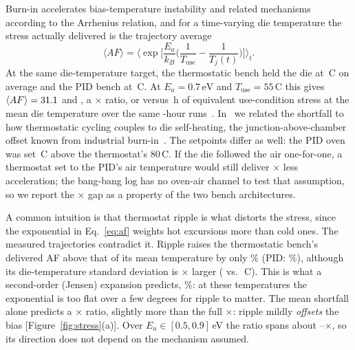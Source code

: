 \documentclass[10pt,twocolumn]{article}
\newcommand{\degC}{\,\textdegree C}
\newcommand{\unit}[1]{\,\mathrm{#1}}
\begin{document}
Burn-in accelerates bias-temperature instability and related mechanisms according to the Arrhenius relation, and for a time-varying die temperature the stress actually delivered is the trajectory average
\begin{equation}
\langle AF\rangle=\Big\langle \exp\!\Big[\frac{E_a}{k_B}\Big(\frac{1}{T_{\mathrm{use}}}-\frac{1}{T_j(t)}\Big)\Big]\Big\rangle_t .
\label{eq:af}
\end{equation}
At the same die-temperature target, the thermostatic bench held the die at \vTBB\degC{} on average and the PID bench at \vTPID\degC. At $E_a=0.7\unit{eV}$ and $T_{\mathrm{use}}=55$\degC{} this gives $\langle AF\rangle=31.1$ and \vAFPID, a \vAFratio$\times$ ratio, or \vEqhBB{} versus \vEqhPID\,h of equivalent use-condition stress at the mean die temperature over the same \vDurPair-hour runs~\cite{sbcci26}. In~\cite{sbcci26} we related the shortfall to how thermostatic cycling couples to die self-heating, the junction-above-chamber offset known from industrial burn-in~\cite{vassighi,semenov}. The setpoints differ as well: the PID oven was set \vSPoffset\degC{} above the thermostat's 80\degC. If the die followed the air one-for-one, a thermostat set to the PID's air temperature would still deliver \vAFratioSPadj$\times$ less acceleration; the bang-bang log has no oven-air channel to test that assumption, so we report the \vAFratio$\times$ gap as a property of the two bench architectures.

A common intuition is that thermostat ripple is what distorts the stress, since the exponential in Eq.~\eqref{eq:af} weights hot excursions more than cold ones. The measured trajectories contradict it. Ripple raises the thermostatic bench's delivered AF above that of its mean temperature by only \vRippleBB\% (PID: \vRipplePID\%), although its die-temperature standard deviation is \vTsdRatio$\times$ larger (\vTsdBB{} vs.\ \vTsdPID\degC). This is what a second-order (Jensen) expansion predicts, \vJensen\%: at these temperatures the exponential is too flat over a few degrees for ripple to matter. The mean shortfall alone predicts a \vAFratioMeanOnly$\times$ ratio, slightly more than the full \vAFratio$\times$: ripple mildly \emph{offsets} the bias [Figure~\ref{fig:stress}(a)]. Over $E_a\in[0.5,0.9]$\,eV the ratio spans about \vAFratioLoOne--\vAFratioHiOne$\times$, so its direction does not depend on the mechanism assumed.
\end{document}
